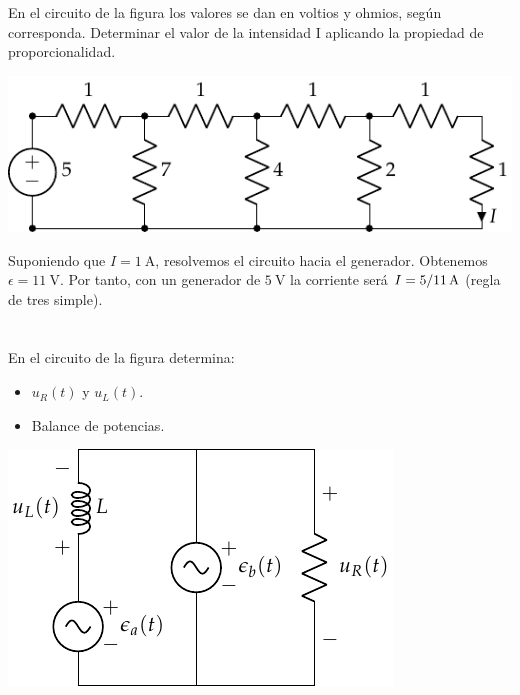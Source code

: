 \documentclass[12pt]{article}
\begin{document}
\title{}

\date{}

\section{}
En el circuito de la figura los valores se dan en voltios y ohmios, según corresponda. Determinar el valor de la intensidad I aplicando la propiedad de proporcionalidad.

\begin{center}
\includegraphics{../figs/problema_proporcionalidad}
\end{center}

\noindent\hrulefill

Suponiendo que $I = \SI{1}{\ampere}$, resolvemos el circuito hacia el generador. Obtenemos $\epsilon = \SI{11}{\volt}$. Por tanto, con un generador de $\SI{5}{\volt}$ la corriente será $I = \SI[parse-numbers=false]{5/11}{\ampere}$ (regla de tres simple).


\section{}

En el circuito de la figura determina:
\begin{itemize}
\item $u_R(t)$  y $u_L(t)$.
\item Balance de potencias.
\end{itemize}

\begin{center}
\includegraphics{../figs/superposicion2_ej}
\end{center}
\end{document}
